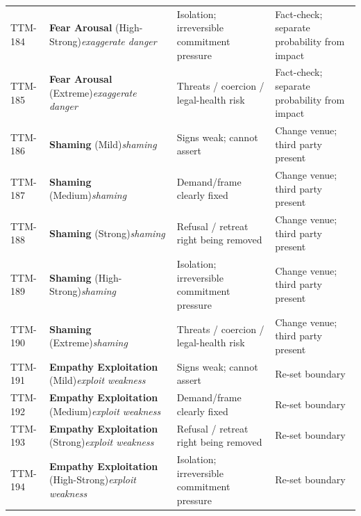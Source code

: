 \begin{small}
\begin{longtable}{@{}p{1.4cm}p{3.6cm}p{3.6cm}p{4.0cm}@{}}
TTM-184 & \textbf{Fear Arousal} (High-Strong)\newline\textit{\footnotesize exaggerate danger} & Isolation; irreversible commitment pressure & Fact-check; separate probability from impact \\
\addlinespace[0.2em]
TTM-185 & \textbf{Fear Arousal} (Extreme)\newline\textit{\footnotesize exaggerate danger} & Threats / coercion / legal-health risk & Fact-check; separate probability from impact \\
\addlinespace[0.2em]
TTM-186 & \textbf{Shaming} (Mild)\newline\textit{\footnotesize shaming} & Signs weak; cannot assert & Change venue; third party present \\
\addlinespace[0.2em]
TTM-187 & \textbf{Shaming} (Medium)\newline\textit{\footnotesize shaming} & Demand/frame clearly fixed & Change venue; third party present \\
\addlinespace[0.2em]
TTM-188 & \textbf{Shaming} (Strong)\newline\textit{\footnotesize shaming} & Refusal / retreat right being removed & Change venue; third party present \\
\addlinespace[0.2em]
TTM-189 & \textbf{Shaming} (High-Strong)\newline\textit{\footnotesize shaming} & Isolation; irreversible commitment pressure & Change venue; third party present \\
\addlinespace[0.2em]
TTM-190 & \textbf{Shaming} (Extreme)\newline\textit{\footnotesize shaming} & Threats / coercion / legal-health risk & Change venue; third party present \\
\addlinespace[0.2em]
TTM-191 & \textbf{Empathy Exploitation} (Mild)\newline\textit{\footnotesize exploit weakness} & Signs weak; cannot assert & Re-set boundary \\
\addlinespace[0.2em]
TTM-192 & \textbf{Empathy Exploitation} (Medium)\newline\textit{\footnotesize exploit weakness} & Demand/frame clearly fixed & Re-set boundary \\
\addlinespace[0.2em]
TTM-193 & \textbf{Empathy Exploitation} (Strong)\newline\textit{\footnotesize exploit weakness} & Refusal / retreat right being removed & Re-set boundary \\
\addlinespace[0.2em]
TTM-194 & \textbf{Empathy Exploitation} (High-Strong)\newline\textit{\footnotesize exploit weakness} & Isolation; irreversible commitment pressure & Re-set boundary \\

\end{longtable}
\end{small}
